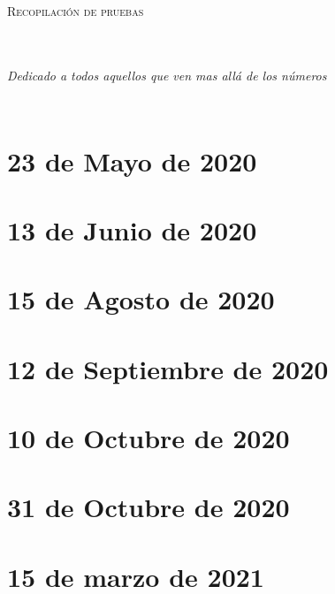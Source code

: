 \documentclass[letterpaper,11pt,oneside]{book}
\theoremstyle{definition}
\theoremstyle{remark}
\begin{document}
	
	\begin{titlepage}
		\begin{center}
			\begin{Huge}
				\textsc{Recopilación de pruebas}
			\end{Huge}
		\end{center}
	\end{titlepage}
	
	\newpage
	$\ $
	\thispagestyle{empty} %
	
	\chapter*{}
	\begin{flushright}
		\textit{Dedicado a todos aquellos que ven mas all\'a de los n\'umeros}
	\end{flushright}
	
	\newpage
	$\ $
	\thispagestyle{empty}
	
	
	\tableofcontents
	
	\newpage
	$\ $
	\thispagestyle{empty} %
	
	
	\chapter{23 de Mayo de 2020}\label{chap:23mayo2020}
	
	
	\chapter{13 de Junio de 2020}\label{chap:13junio2020}
	

	\chapter{15 de Agosto de 2020}\label{chap:15agosto2020}
	
	
	\chapter{12 de Septiembre de 2020}\label{chap:12septiembre2020}
	
	
	\chapter{10 de Octubre  de 2020}\label{chap:10octubre2020}
	
	
	\chapter{31 de Octubre  de 2020}\label{chap:2020_10_31}
	
	
	\chapter{15 de marzo de 2021}
	
		
		
\end{document}
